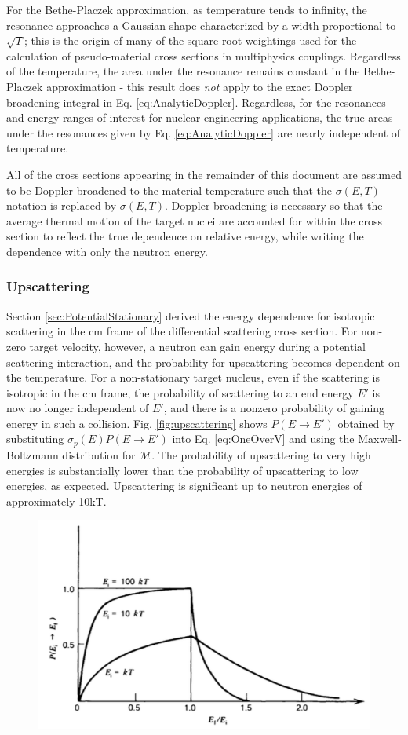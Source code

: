 For the Bethe-Placzek approximation, as temperature tends to infinity, the resonance approaches a Gaussian shape characterized by a width proportional to \(\sqrt{T}\); this is the origin of many of the square-root weightings used for the calculation of pseudo-material cross sections in multiphysics couplings. Regardless of the temperature, the area under the resonance remains constant in the Bethe-Placzek approximation - this result does {\it not} apply to the exact Doppler broadening integral in Eq. \eqref{eq:AnalyticDoppler}. Regardless, for the resonances and energy ranges of interest for nuclear engineering applications, the true areas under the resonances given by Eq. \eqref{eq:AnalyticDoppler} are nearly independent of temperature. 

All of the cross sections appearing in the remainder of this document are assumed to be Doppler broadened to the material temperature such that the \(\bar{\sigma}(E,T)\) notation is replaced by \(\sigma(E,T)\). Doppler broadening is necessary so that the average thermal motion of the target nuclei are accounted for within the cross section to reflect the true dependence on relative energy, while writing the dependence with only the neutron energy.

\subsubsection{Upscattering}

Section \ref{sec:PotentialStationary} derived the energy dependence for isotropic scattering in the \gls{cm} frame of the differential scattering cross section. For non-zero target velocity, however, a neutron can gain energy during a potential scattering interaction, and the probability for upscattering becomes dependent on the temperature. For a non-stationary target nucleus, even if the scattering is isotropic in the \gls{cm} frame, the probability of scattering to an end energy \(E'\) is now no longer independent of \(E'\), and there is a nonzero probability of gaining energy in such a collision. Fig. \ref{fig:upscattering} shows \(P(E\rightarrow E')\) obtained by substituting \(\sigma_p(E)P(E\rightarrow E')\) into Eq. \eqref{eq:OneOverV} and using the Maxwell-Boltzmann distribution for \(\mathscr{M}\). The probability of upscattering to very high energies is substantially lower than the probability of upscattering to low energies, as expected. Upscattering is significant up to neutron energies of approximately 10kT. 

\begin{figure}[H]
\centering
\includegraphics[width=0.5\linewidth]{figures/upscattering.png}
\end{figure}
